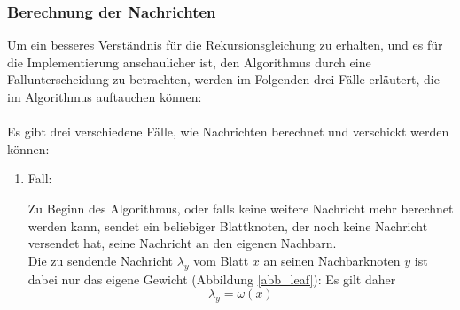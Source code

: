 \subsubsection{Berechnung der Nachrichten}

Um ein besseres Verständnis für die Rekursionsgleichung zu erhalten, und es für die Implementierung anschaulicher ist, den Algorithmus durch eine Fallunterscheidung zu betrachten, werden im Folgenden drei Fälle erläutert, die im Algorithmus auftauchen können:\\\\	
Es gibt drei verschiedene Fälle, wie Nachrichten berechnet und verschickt werden können:

\begin{enumerate}
	
	\item Fall:
		
		
		
			
		Zu Beginn des Algorithmus, oder falls keine weitere Nachricht mehr berechnet werden kann, sendet ein beliebiger Blattknoten, der noch keine Nachricht versendet hat, seine Nachricht an den eigenen Nachbarn.\\
		
		Die zu sendende Nachricht $\lambda_{y}$ vom Blatt $x$ an seinen Nachbarknoten $y$ ist dabei nur das eigene Gewicht (Abbildung \ref{abb_leaf}): Es gilt daher $$\lambda_{y} = \omega(x)$$
		


\end{enumerate}
